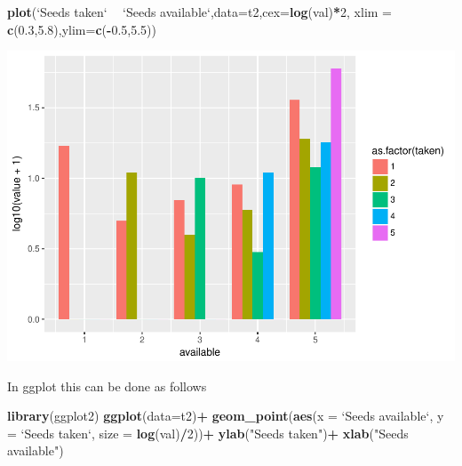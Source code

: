 \documentclass[11pt,]{article}
\newenvironment{Shaded}{\begin{snugshade}}{\end{snugshade}}
\newcommand{\KeywordTok}[1]{\textcolor[rgb]{0.13,0.29,0.53}{\textbf{#1}}}
\newcommand{\DataTypeTok}[1]{\textcolor[rgb]{0.13,0.29,0.53}{#1}}
\newcommand{\DecValTok}[1]{\textcolor[rgb]{0.00,0.00,0.81}{#1}}
\newcommand{\FloatTok}[1]{\textcolor[rgb]{0.00,0.00,0.81}{#1}}
\newcommand{\StringTok}[1]{\textcolor[rgb]{0.31,0.60,0.02}{#1}}
\newcommand{\OperatorTok}[1]{\textcolor[rgb]{0.81,0.36,0.00}{\textbf{#1}}}
\newcommand{\NormalTok}[1]{#1}
\begin{document}
\begin{Shaded}
\begin{Highlighting}[]
\KeywordTok{plot}\NormalTok{(}\StringTok{`}\DataTypeTok{Seeds taken}\StringTok{`} \OperatorTok{~}\StringTok{ `}\DataTypeTok{Seeds available}\StringTok{`}\NormalTok{,}\DataTypeTok{data=}\NormalTok{t2,}\DataTypeTok{cex=}\KeywordTok{log}\NormalTok{(val)}\OperatorTok{*}\DecValTok{2}\NormalTok{,}
        \DataTypeTok{xlim =} \KeywordTok{c}\NormalTok{(}\FloatTok{0.3}\NormalTok{,}\FloatTok{5.8}\NormalTok{),}\DataTypeTok{ylim=}\KeywordTok{c}\NormalTok{(}\OperatorTok{-}\FloatTok{0.5}\NormalTok{,}\FloatTok{5.5}\NormalTok{))}
\end{Highlighting}
\end{Shaded}

\includegraphics{Lab_2_modified_files/figure-latex/unnamed-chunk-40-1.pdf}

In ggplot this can be done as follows

\begin{Shaded}
\begin{Highlighting}[]
\KeywordTok{library}\NormalTok{(ggplot2)}
    \KeywordTok{ggplot}\NormalTok{(}\DataTypeTok{data=}\NormalTok{t2)}\OperatorTok{+}
\StringTok{        }\KeywordTok{geom_point}\NormalTok{(}\KeywordTok{aes}\NormalTok{(}\DataTypeTok{x =} \StringTok{`}\DataTypeTok{Seeds available}\StringTok{`}\NormalTok{, }\DataTypeTok{y =} \StringTok{`}\DataTypeTok{Seeds taken}\StringTok{`}\NormalTok{, }
                       \DataTypeTok{size =} \KeywordTok{log}\NormalTok{(val)}\OperatorTok{/}\DecValTok{2}\NormalTok{))}\OperatorTok{+}
\StringTok{      }\KeywordTok{ylab}\NormalTok{(}\StringTok{"Seeds taken"}\NormalTok{)}\OperatorTok{+}
\StringTok{      }\KeywordTok{xlab}\NormalTok{(}\StringTok{"Seeds available"}\NormalTok{)}
\end{Highlighting}
\end{Shaded}
\end{document}
